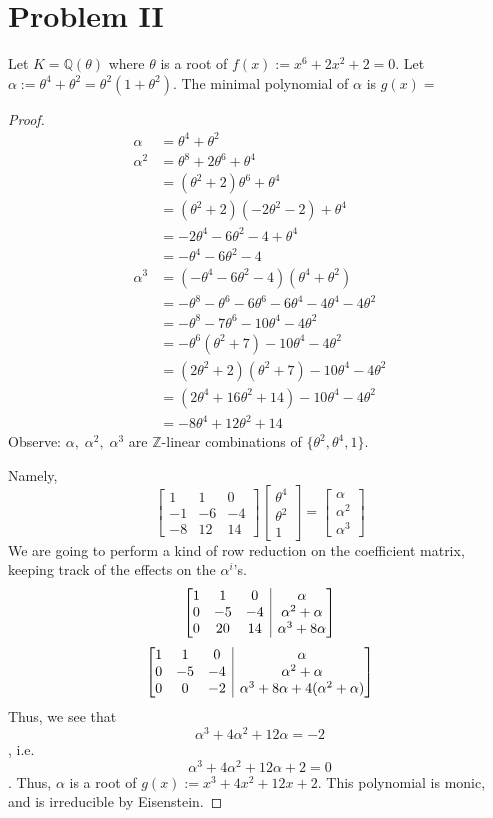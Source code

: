 \documentclass{article}
\newcommand{\Q}{\mathbb{Q}}
\newcommand{\Z}{\mathbb{Z}}
\begin{document}
\section*{Problem II}
Let $K=\Q(\theta)$ where $\theta$ is a root of $f(x):=x^6+2x^2+2=0$. Let $\alpha:=\theta^4+\theta^2=\theta^2(1+\theta^2)$.  The minimal polynomial of $\alpha$ is $g(x)= $
\begin{proof}
	\begin{align*}
	\alpha&=\theta^4+\theta^2\\
	\alpha^2&=\theta^8+2\theta^6+\theta^4\\
	&= (\theta^2+2)\theta^6+\theta^4\\
	&= (\theta^2+2)(-2\theta^2-2)+\theta^4\\
	&=-2\theta^4-6\theta^2-4+\theta^4\\
	&=-\theta^4-6\theta^2-4\\
	\alpha^3&=(-\theta^4-6\theta^2-4)(\theta^4+\theta^2)\\
	&=-\theta^8-\theta^6-6\theta^6-6\theta^4-4\theta^4-4\theta^2\\
	&=-\theta^8-7\theta^6-10\theta^4-4\theta^2\\
	&=-\theta^6(\theta^2+7)-10\theta^4-4\theta^2\\
	&=(2\theta^2+2)(\theta^2+7)-10\theta^4-4\theta^2\\
	&=(2\theta^4+16\theta^2+14)-10\theta^4-4\theta^2\\
	&=-8\theta^4+12\theta^2+14	
	\end{align*}Observe: $\alpha,\;\alpha^2,\;\alpha^3$ are $\Z$-linear combinations of $\{\theta^2,\theta^4,1\}$.
	
	Namely,
	\[
	\begin{bmatrix}
	1&1&0\\
	-1&-6&-4\\
	-8&12&14
	\end{bmatrix}
	\begin{bmatrix}
	\theta^4\\
	\theta^2\\
	1
	\end{bmatrix}
	=
	\begin{bmatrix}
	\alpha\\
	\alpha^2\\
	\alpha^3
	\end{bmatrix}
	\]We are going to perform a kind of row reduction on the coefficient matrix, keeping track of the effects on the $\alpha^i$'s.
	\[
	\left[
	\begin{array}{@{}ccc|c@{}}
	1 & 1 & 0 & \alpha\\
	0&-5&-4&\alpha^2+\alpha\\
	0&20&14&\alpha^3+8\alpha
	\end{array}
	\right]\]
	\[
	\left[
	\begin{array}{@{}ccc|c@{}}
	1&1&0&\alpha\\
	0&-5&-4&\alpha^2+\alpha\\
	0&0&-2&\alpha^3+8\alpha+4(\alpha^2+\alpha)
	\end{array}
	\right]
	\]Thus, we see that $$\alpha^3+4\alpha^2+12\alpha=-2$$, i.e.$$\alpha^3+4\alpha^2+12\alpha+2=0$$.  Thus, $\alpha$ is a root of $g(x):=x^3+4x^2+12x+2$.  This polynomial is monic, and is irreducible by Eisenstein.
\end{proof}
\end{document}
